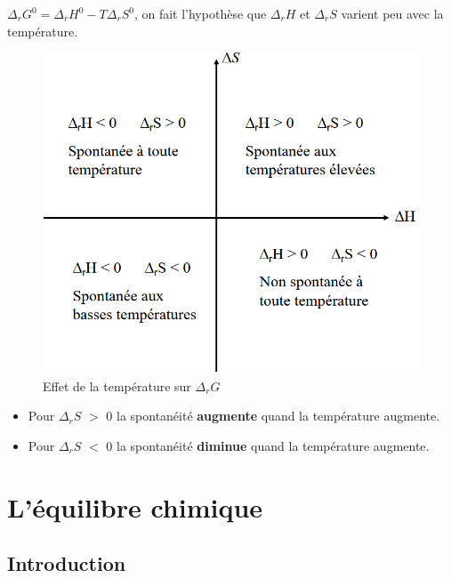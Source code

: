 \documentclass[10pt,a4paper]{book}
\begin{document}
\textbf{\(\Delta_rG^0 = \Delta_rH^0 - T\Delta_rS^0\)}, on fait l'hypothèse que $\Delta_rH$ et $\Delta_rS$ varient peu avec la température.
\begin{figure}[h!]
\begin{center}
\includegraphics[scale=0.75]{./assets/temp_gibbs.png}
\caption{Effet de la température sur $\Delta_rG$}
\label{fig:temp_gibbs}
\end{center}
\end{figure}
\begin{itemize}
\item Pour $\Delta_rS$ $>$ 0 la spontanéité \textbf{augmente} quand la température augmente.
\item Pour $\Delta_rS$ $<$ 0 la spontanéité \textbf{diminue} quand la température augmente.
\end{itemize}

\chapter{L'équilibre chimique}

\section{Introduction}
\end{document}
